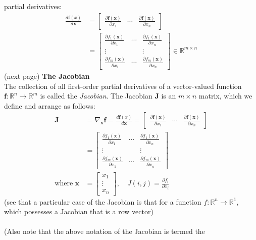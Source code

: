\documentclass{report}
\begin{document}
partial derivatives:
\begin{align*}
\frac{d\bm{f}(x)}{d\bm{x}}&=\begin{bmatrix}
\frac{\partial\bm{f}(\bm{x})}{\partial x_1}&\cdots&
\frac{\partial\bm{f}(\bm{x})}{\partial x_n}\end{bmatrix}\\
&=\begin{bmatrix}
\frac{\partial f_1(\bm{x})}{\partial x_1}&\cdots&
\frac{\partial f_1(\bm{x})}{\partial x_n}\\
\vdots&&\vdots\\
\frac{\partial f_m(\bm{x})}{\partial x_1}&\cdots&
\frac{\partial f_m(\bm{x})}{\partial x_n}
\end{bmatrix}\in\mathbb{R}^{m\times n}
\end{align*}
(next page)
\newpage
\noindent\textbf{The Jacobian}\\
The collection of all first-order partial derivatives of a vector-valued function 
$\bm{f}:\mathbb{R}^n\to\mathbb{R}^m$ is called the \textit{Jacobian}. The Jacobian $\bm{J}$ is an $m\times n$ 
matrix, which we define and arrange as follows:
\begin{align*}
\bm{J}&=\nabla_{\bm{x}}\bm{f}=\frac{d\bm{f}(x)}{d\bm{x}}=
\begin{bmatrix}\frac{\partial\bm{f}(\bm{x})}{\partial x_1}&\cdots&
\frac{\partial\bm{f}(\bm{x})}{\partial x_n}\end{bmatrix}\\
&=\begin{bmatrix}
\frac{\partial f_1(\bm{x})}{\partial x_1}&\cdots&
\frac{\partial f_1(\bm{x})}{\partial x_n}\\
\vdots&&\vdots\\
\frac{\partial f_m(\bm{x})}{\partial x_1}&\cdots&
\frac{\partial f_m(\bm{x})}{\partial x_n}
\end{bmatrix}\\
\text{where }\bm{x}&=\begin{bmatrix}x_1\\\vdots\\x_n
\end{bmatrix},\quad J(i,j)=\frac{\partial f_i}{\partial x_i}
\end{align*}
(see that a particular case of the Jacobian is that for a function $f:\mathbb{R}^n\to\mathbb{R}^1$, which 
possesses a Jacobian that is a row vector)\\
\vspace{1mm}\\
(Also note that the above notation of the Jacobian is termed the 
\end{document}
